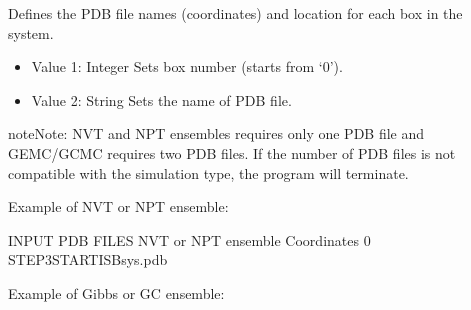 \documentclass[letterpaper,10pt,english]{sphinxmanual}
\begin{document}
\begin{description}
\item[{}] \leavevmode
Defines the PDB file names (coordinates) and location for each box in the system.
\begin{itemize}
\item {} 
Value 1: Integer \sphinxhyphen{} Sets box number (starts from ‘0’).

\item {} 
Value 2: String \sphinxhyphen{} Sets the name of PDB file.

\end{itemize}

\begin{sphinxadmonition}{note}{Note:}
NVT and NPT ensembles requires only one PDB file and GEMC/GCMC requires two PDB files. If the number of PDB files is not compatible with the simulation type, the program will terminate.
\end{sphinxadmonition}

Example of NVT or NPT ensemble:

\begin{sphinxVerbatim}[commandchars=\\\{\}]
\PYGZsh{}\PYGZsh{}\PYGZsh{}\PYGZsh{}\PYGZsh{}\PYGZsh{}\PYGZsh{}\PYGZsh{}\PYGZsh{}\PYGZsh{}\PYGZsh{}\PYGZsh{}\PYGZsh{}\PYGZsh{}\PYGZsh{}\PYGZsh{}\PYGZsh{}\PYGZsh{}\PYGZsh{}\PYGZsh{}\PYGZsh{}\PYGZsh{}\PYGZsh{}\PYGZsh{}\PYGZsh{}\PYGZsh{}\PYGZsh{}\PYGZsh{}\PYGZsh{}\PYGZsh{}\PYGZsh{}\PYGZsh{}\PYGZsh{}\PYGZsh{}\PYGZsh{}\PYGZsh{}\PYGZsh{}\PYGZsh{}\PYGZsh{}\PYGZsh{}\PYGZsh{}\PYGZsh{}\PYGZsh{}\PYGZsh{}\PYGZsh{}
\PYGZsh{} INPUT PDB FILES \PYGZhy{} NVT or NPT ensemble
\PYGZsh{}\PYGZsh{}\PYGZsh{}\PYGZsh{}\PYGZsh{}\PYGZsh{}\PYGZsh{}\PYGZsh{}\PYGZsh{}\PYGZsh{}\PYGZsh{}\PYGZsh{}\PYGZsh{}\PYGZsh{}\PYGZsh{}\PYGZsh{}\PYGZsh{}\PYGZsh{}\PYGZsh{}\PYGZsh{}\PYGZsh{}\PYGZsh{}\PYGZsh{}\PYGZsh{}\PYGZsh{}\PYGZsh{}\PYGZsh{}\PYGZsh{}\PYGZsh{}\PYGZsh{}\PYGZsh{}\PYGZsh{}\PYGZsh{}\PYGZsh{}\PYGZsh{}\PYGZsh{}\PYGZsh{}\PYGZsh{}\PYGZsh{}\PYGZsh{}\PYGZsh{}\PYGZsh{}\PYGZsh{}\PYGZsh{}\PYGZsh{}
Coordinates   0   STEP3\PYGZus{}START\PYGZus{}ISB\PYGZus{}sys.pdb
\end{sphinxVerbatim}

Example of Gibbs or GC ensemble:


\end{description}
\end{document}

